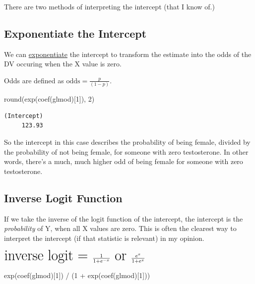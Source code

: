 \documentclass[
  letterpaper,
  DIV=11,
  numbers=noendperiod,
  oneside]{scrreprt}
\newenvironment{Shaded}{\begin{snugshade}}{\end{snugshade}}
\newcommand{\DecValTok}[1]{\textcolor[rgb]{0.68,0.00,0.00}{#1}}
\newcommand{\FunctionTok}[1]{\textcolor[rgb]{0.28,0.35,0.67}{#1}}
\newcommand{\NormalTok}[1]{\textcolor[rgb]{0.00,0.23,0.31}{#1}}
\newcommand{\SpecialCharTok}[1]{\textcolor[rgb]{0.37,0.37,0.37}{#1}}
\begin{document}
There are two methods of interpreting the intercept (that I know of.)

\subsection{Exponentiate the
Intercept}\label{exponentiate-the-intercept}

We can
\href{http://www.mathsisfun.com/algebra/exponents-logarithms.html}{exponentiate}
the intercept to transform the estimate into the odds of the DV occuring
when the X value is zero.

Odds are defined as \(\text{odds} = \frac{p}{(1-p)}\).

\begin{Shaded}
\begin{Highlighting}[]
\FunctionTok{round}\NormalTok{(}\FunctionTok{exp}\NormalTok{(}\FunctionTok{coef}\NormalTok{(glmod)[}\DecValTok{1}\NormalTok{]), }\DecValTok{2}\NormalTok{)}
\end{Highlighting}
\end{Shaded}

\begin{verbatim}
(Intercept) 
     123.93 
\end{verbatim}

So the intercept in this case describes the probability of being female,
divided by the probability of not being female, for someone with zero
testosterone. In other words, there's a much, much higher odd of being
female for someone with zero testosterone.

\subsection{Inverse Logit Function}\label{inverse-logit-function}

If we take the inverse of the logit function of the intercept, the
intercept is the \emph{probability} of Y, when all X values are zero.
This is often the clearest way to interpret the intercept (if that
statistic is relevant) in my opinion.

\(\huge \text{inverse logit = } \frac{1}{1 + e^{-x}} \text{ or } \frac{e^{x}}{1 + e^{x}}\)

\begin{Shaded}
\begin{Highlighting}[]
\FunctionTok{exp}\NormalTok{(}\FunctionTok{coef}\NormalTok{(glmod)[}\DecValTok{1}\NormalTok{]) }\SpecialCharTok{/}\NormalTok{ (}\DecValTok{1} \SpecialCharTok{+} \FunctionTok{exp}\NormalTok{(}\FunctionTok{coef}\NormalTok{(glmod)[}\DecValTok{1}\NormalTok{]))}
\end{Highlighting}
\end{Shaded}
\end{document}
